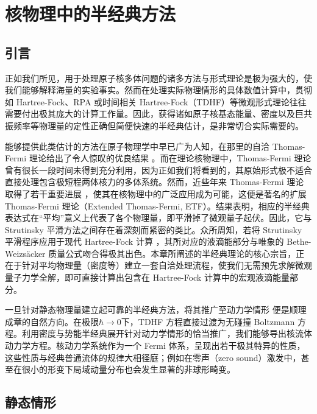 
\chapter{核物理中的半经典方法\label{chap:=006838=007269=007406=004E2D=007684=00534A=007ECF=005178=0065B9=006CD5}}

\section{引言\label{sec:13.1_=005F15=008A00}}

正如我们所见，用于处理原子核多体问题的诸多方法与形式理论是极为强大的，使我们能够解释海量的实验事实。然而在处理实际物理情形的具体数值计算中，贯彻如
Hartree-Fock、RPA 或时间相关 Hartree-Fock（TDHF）等微观形式理论往往需要付出极其庞大的计算工作量。因此，获得诸如原子核基态能量、密度以及巨共振频率等物理量的定性正确但简便快速的半经典估计，是非常切合实际需要的。

能够提供此类估计的方法在原子物理学中早已广为人知，在那里的自洽 Thomas-Fermi 理论给出了令人惊叹的优良结果 \cite{Go48}。而在理论核物理中，Thomas-Fermi
理论 \cite{SB63,Be71,MS69} 曾有很长一段时间未得到充分利用，因为正如我们将看到的，其原始形式极不适合直接处理包含极短程两体核力的多体系统。然而，近些年来
Thomas-Fermi 理论取得了若干重要进展 \cite{Ki67,BR71b,Gr72,BB72,BB74,BZ73,BJC76,BCK76,GS77,CJB77,DBS78}，使其在核物理中的广泛应用成为可能，这便是著名的扩展
Thomas-Fermi 理论（Extended Thomas-Fermi, ETF）。结果表明，相应的半经典表达式在“平均”意义上代表了各个物理量，即平滑掉了微观量子起伏。因此，它与
Strutinsky 平滑方法之间存在着深刻而紧密的类比。众所周知，若将 Strutinsky 平滑程序应用于现代 Hartree-Fock
计算 \cite{BQ75a,BQ75b}，其所对应的液滴能部分与唯象的 Bethe-Weizsäcker 质量公式吻合得极其出色。本章所阐述的半经典理论的核心宗旨，正在于针对平均物理量（密度等）建立一套自洽处理流程，使我们无需预先求解微观量子力学全解，即可直接计算出包含在
Hartree-Fock 计算中的宏观液滴能量部分。

一旦针对静态物理量建立起可靠的半经典方法，将其推广至动力学情形 \cite[及其中参考文献]{WMW75,HE78}
便是顺理成章的自然方向。在极限$\hbar\to0$下，TDHF 方程直接过渡为无碰撞 Boltzmann 方程。利用密度与势能半经典展开针对动力学情形的恰当推广，我们能够导出核流体动力学方程。核动力学系统作为一个
Fermi 体系，呈现出若干极其特异的性质，这些性质与经典普通流体的规律大相径庭；例如在零声（zero sound）激发中，甚至在很小的形变下局域动量分布也会发生显著的非球形畸变。

\section{静态情形\label{sec:13.2_=009759=006001=0060C5=005F62}}

